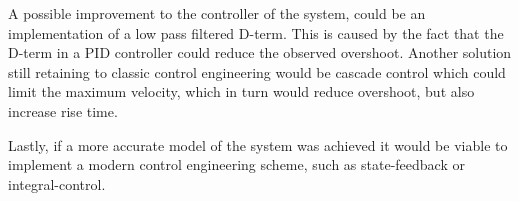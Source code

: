 \documentclass[../../Main]{subfiles}
\begin{document}

A possible improvement to the controller of the system, could be an implementation of a low pass filtered D-term. This is caused by the fact that the D-term in a PID controller could reduce the observed overshoot.
Another solution still retaining to classic control engineering would be  cascade control which could limit the maximum velocity,  which in turn would reduce overshoot, but also increase rise time.

Lastly, if a more accurate model of the system was achieved it would be viable to implement a modern control engineering scheme, such as state-feedback or integral-control.
\end{document}
